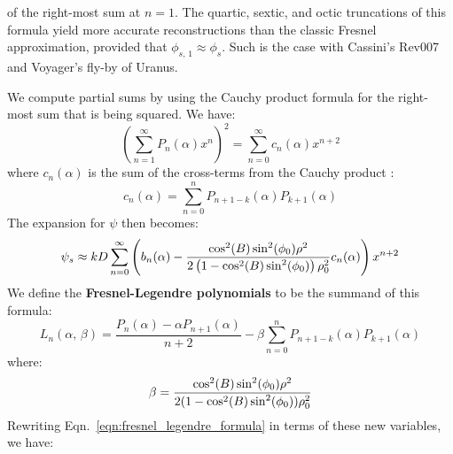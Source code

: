 \documentclass{article}
\theoremstyle{plain}
\begin{document}
        of the right-most sum at $n=1$. The quartic, sextic, and octic
        truncations of this formula yield more
        accurate reconstructions than the classic Fresnel approximation,
        provided that $\phi_{s,\,1}\approx\phi_{s}$. Such is the case with
        Cassini's Rev007 and Voyager's fly-by of Uranus.
        \par\hfill\par
        We compute partial sums by using the Cauchy product formula for the
        right-most sum that is being squared. We have:
        \begin{equation}
            \left(\sum_{n=1}^{\infty}P_{n}(\alpha)x^{n}\right)^{2}
            =\sum_{n=0}^{\infty}c_{n}(\alpha)x^{n+2}
        \end{equation}
        where $c_{n}(\alpha)$ is the sum of the cross-terms from the Cauchy
        product \cite[Def.~3.48]{RudinPrinciplesOfMathematicalAnalysis}:
        \begin{equation}
            c_{n}(\alpha)=\sum_{n=0}^{n}P_{n+1-k}(\alpha)P_{k+1}(\alpha)
        \end{equation}
        The expansion for $\psi$ then becomes:
        \begin{equation}
            \label{eqn:fresnel_legendre_formula}
            \psi_{s}\approx
            kD\sum_{n=0}^{\infty}\left(
                b_{n}(\alpha)-
                \frac{%
                    \cos^{2}(B)\sin^{2}(\phi_{0})\rho^{2}
                }{%
                    2\left(1-\cos^{2}(B)\sin^{2}(\phi_{0})\right)
                    \rho_{0}^{2}
                }
                c_{n}(\alpha)
            \right)x^{n+2}
        \end{equation}
        We define the \textbf{Fresnel-Legendre polynomials} to be the
        summand of this formula:
        \begin{equation}
            \label{eqn:fresnel_legendre_coeffs}
            L_{n}(\alpha,\,\beta)
            =\frac{P_{n}(\alpha)-\alpha{P}_{n+1}(\alpha)}{n+2}
                -\beta\sum_{n=0}^{n}P_{n+1-k}(\alpha)P_{k+1}(\alpha)
        \end{equation}
        where:
        \begin{equation}
            \beta=
            \frac{%
                \cos^{2}(B)\sin^{2}(\phi_{0})\rho^{2}
            }{%
                2(1-\cos^{2}(B)\sin^{2}(\phi_{0}))\rho_{0}^{2}
            }
        \end{equation}
        Rewriting Eqn.~\ref{eqn:fresnel_legendre_formula} in terms of
        these new variables, we have:
\end{document}
